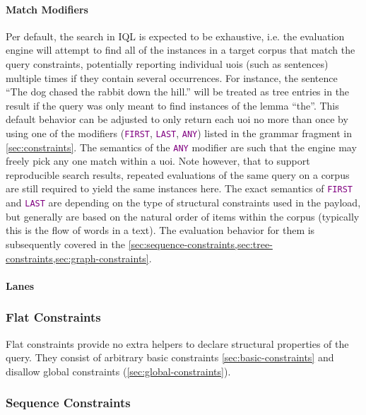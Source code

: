 \documentclass[11pt,a4paper,portrait]{article}
\newcommand{\iql}{IQL\xspace}
\newcommand{\keyword}[1]{\textcolor{purple}{\texttt{#1}}}
\begin{document}
\paragraph{Match Modifiers}
\label{sec:mathc-modifiers}
Per default, the search in \iql is expected to be exhaustive, i.e. the evaluation engine will attempt to find all of the instances in a target corpus that match the query constraints, potentially reporting individual \acp{uoi} (such as sentences) multiple times  if they contain several occurrences.
For instance, the sentence ``The dog chased the rabbit down the hill.'' will be treated as tree entries in the result if the query was only meant to find instances of the lemma ``the''.
This default behavior can be adjusted to only return each \ac{uoi} no more than once by using one of the modifiers (\keyword{FIRST}, \keyword{LAST}, \keyword{ANY}) listed in the grammar fragment in \cref{sec:constraints}.
The semantics of the \keyword{ANY} modifier are such that the engine may freely pick any one match within a \ac{uoi}.
Note however, that to support reproducible search results, repeated evaluations of the same query on a corpus are still required to yield the same instances here.
The exact semantics of \keyword{FIRST} and \keyword{LAST} are depending on the type of structural constraints used in the payload, but generally are based on the natural order of items within the corpus (typically this is the flow of words in a text).
The evaluation behavior for them is subsequently covered in the \cref{sec:sequence-constraints,sec:tree-constraints,sec:graph-constraints}.

\paragraph{Lanes}
\label{sec:lanes}

\subsubsection{Flat Constraints}
\label{sec:flat-constraints}

Flat constraints provide no extra helpers to declare structural properties of the query. 
They consist of arbitrary basic constraints \cref{sec:basic-constraints} and disallow global constraints (\ref{sec:global-constraints}). 

\subsubsection{Sequence Constraints}
\label{sec:sequence-constraints}
\end{document}
